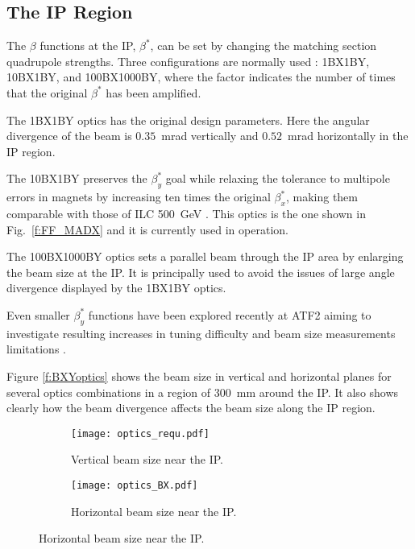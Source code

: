 {{\subsection{The IP Region}\label{s:opticsIP}
The $\beta$ functions at the IP, $\beta^*$, can be set by changing the matching section quadrupole strengths. Three configurations are normally used : 1BX1BY, 10BX1BY, and 100BX1000BY, where the factor indicates the number of times that the original $\beta^*$ has been amplified.\par
The 1BX1BY optics has the original design parameters. Here the angular divergence of the beam is $0.35$~mrad vertically and $0.52$~mrad horizontally in the IP region. \par
The 10BX1BY preserves the $\beta_y^*$ goal while relaxing the tolerance to multipole errors in magnets by increasing ten times the original $\beta_x^*$, making them comparable with those of ILC 500~GeV \cite{PhysRevSTAB.17.023501}. This optics is the one shown in Fig.~\ref{f:FF_MADX} and it is currently used in operation.\par
The 100BX1000BY optics sets a parallel beam through the IP area by enlarging the beam size at the IP. It is principally used to avoid the issues of large angle divergence displayed by the 1BX1BY optics.\par
Even smaller $\beta_y^*$ functions have been explored recently at ATF2 aiming to investigate resulting increases in tuning difficulty and beam size measurements limitations \cite{PateckiLowBeta}.\par
Figure \ref{f:BXYoptics} shows the beam size in vertical and horizontal planes for several optics combinations in a region of 300~mm around the IP. It also shows clearly how the beam divergence affects the beam size along the IP region.\par 
\begin{figure}[h]
 \begin{center}
 \hspace*{-1cm}
 \begin{subfigure}[b]{0.45\textwidth}
  \texttt{[image: optics\_requ.pdf]}\caption{Vertical beam size near the IP.}\label{f:opticsBY}
 \end{subfigure}\hspace{0.5cm}
\begin{subfigure}[b]{0.45\textwidth}
  \texttt{[image: optics\_BX.pdf]}\caption{Horizontal beam size near the IP.}\label{f:opticsBX}
 \end{subfigure}

\end{center}
\end{figure}}}
